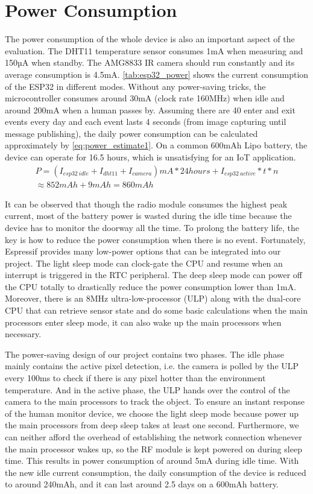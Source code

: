 \section{Power Consumption}
The power consumption of the whole device is also an important aspect of the evaluation. The DHT11 temperature sensor consumes 1mA when measuring and 150µA when standby. The AMG8833 IR camera should run constantly and its average consumption is 4.5mA. \autoref{tab:esp32_power} shows the current consumption of the ESP32 in different modes. Without any power-saving tricks, the microcontroller consumes around 30mA (clock rate 160MHz) when idle and around 200mA when a human passes by. Assuming there are 40 enter and exit events every day and each event lasts 4 seconds (from image capturing until message publishing), the daily power consumption can be calculated approximately by \autoref{eq:power_estimate1}. On a common 600mAh Lipo battery, the device can operate for 16.5 hours, which is unsatisfying for an IoT application.
\begin{equation}\label{eq:power_estimate1}
\begin{split}
  P = (I_{esp32\ idle}+ I_{dht11}+I_{camera})mA * 24 hours + I_{esp32\ active}* t *n\\ \approx 852mAh +  9mAh = 860mAh
\end{split}
\end{equation}

It can be observed that though the radio module consumes the highest peak current, most of the battery power is wasted during the idle time because the device has to monitor the doorway all the time. To prolong the battery life, the key is how to reduce the power consumption when there is no event. Fortunately, Espressif provides many low-power options that can be integrated into our project. The light sleep mode can clock-gate the CPU and resume when an interrupt is triggered in the RTC peripheral. The deep sleep mode can power off the CPU totally to drastically reduce the power consumption lower than 1mA. Moreover, there is an 8MHz ultra-low-processor (ULP) along with the dual-core CPU that can retrieve sensor state and do some basic calculations when the main processors enter sleep mode, it can also wake up the main processors when necessary.

The power-saving design of our project contains two phases. The idle phase mainly contains the active pixel detection, i.e. the camera is polled by the ULP every 100ms to check if there is any pixel hotter than the environment temperature. And in the active phase, the ULP hands over the control of the camera to the main processors to track the object. To ensure an instant response of the human monitor device, we choose the light sleep mode because power up the main processors from deep sleep takes at least one second. Furthermore, we can neither afford the overhead of establishing the network connection whenever the main processor wakes up, so the RF module is kept powered on during sleep time. This results in power consumption of around 5mA during idle time. With the new idle current consumption, the daily consumption of the device is reduced to around 240mAh, and it can last around 2.5 days on a 600mAh battery.

